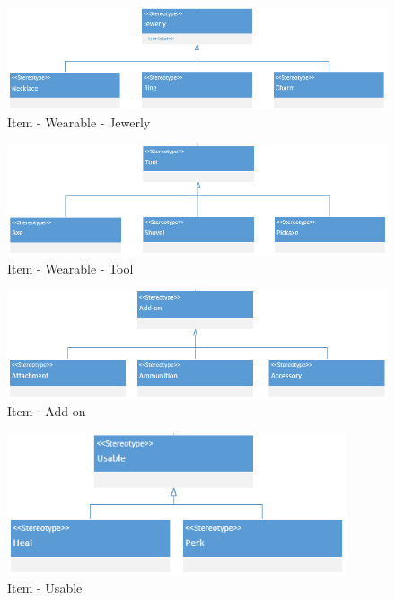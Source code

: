\begin{figure}[H]
    \includegraphics[width=14cm]{10_img/Z_annexeA/item_wearable_jewerly.PNG} 
    \caption{Item - Wearable - Jewerly}
\end{figure}

\begin{figure}[H]
    \includegraphics[width=14cm]{10_img/Z_annexeA/item_werable_tool.PNG} 
    \caption{Item - Wearable - Tool}
\end{figure}

\begin{figure}[H]
    \includegraphics[width=14cm]{10_img/Z_annexeA/item_addon.PNG} 
    \caption{Item - Add-on}
\end{figure}

\begin{figure}[H]
    \includegraphics[width=10cm]{10_img/Z_annexeA/item_usable.PNG} 
    \caption{Item - Usable}
\end{figure}

